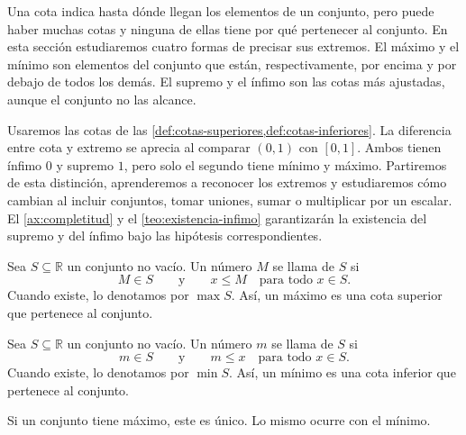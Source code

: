 Una cota indica hasta dónde llegan los elementos de un conjunto, pero puede haber muchas cotas y ninguna de ellas tiene por qué pertenecer al conjunto. En esta sección estudiaremos cuatro formas de precisar sus extremos. El máximo y el mínimo son elementos del conjunto que están, respectivamente, por encima y por debajo de todos los demás. El supremo y el ínfimo son las cotas más ajustadas, aunque el conjunto no las alcance.

Usaremos las cotas de las \cref{def:cotas-superiores,def:cotas-inferiores}. La diferencia entre cota y extremo se aprecia al comparar $(0,1)$ con $[0,1]$. Ambos tienen ínfimo $0$ y supremo $1$, pero solo el segundo tiene mínimo y máximo. Partiremos de esta distinción, aprenderemos a reconocer los extremos y estudiaremos cómo cambian al incluir conjuntos, tomar uniones, sumar o multiplicar por un escalar. El \cref{ax:completitud} y el \cref{teo:existencia-infimo} garantizarán la existencia del supremo y del ínfimo bajo las hipótesis correspondientes.

\begin{samepage}
\begin{definition}[Máximo]
\label{def:maximo}
Sea $S\subseteq\mathbb{R}$ un conjunto no vacío. Un número $M$ se llama  de $S$ si
\[
 M\in S
 \qquad\text{y}\qquad
 x\leq M\quad\text{para todo }x\in S.
\]
Cuando existe, lo denotamos por $\max S$. Así, un máximo es una cota superior que pertenece al conjunto.
\end{definition}
\end{samepage}

\begin{samepage}
\begin{definition}[Mínimo]
\label{def:minimo}
Sea $S\subseteq\mathbb{R}$ un conjunto no vacío. Un número $m$ se llama  de $S$ si
\[
 m\in S
 \qquad\text{y}\qquad
 m\leq x\quad\text{para todo }x\in S.
\]
Cuando existe, lo denotamos por $\min S$. Así, un mínimo es una cota inferior que pertenece al conjunto.
\end{definition}
\end{samepage}

\begin{samepage}
\begin{proposition}
\label{prop:unicidad-extremos}
Si un conjunto tiene máximo, este es único. Lo mismo ocurre con el mínimo.
\end{proposition}
\end{samepage}

